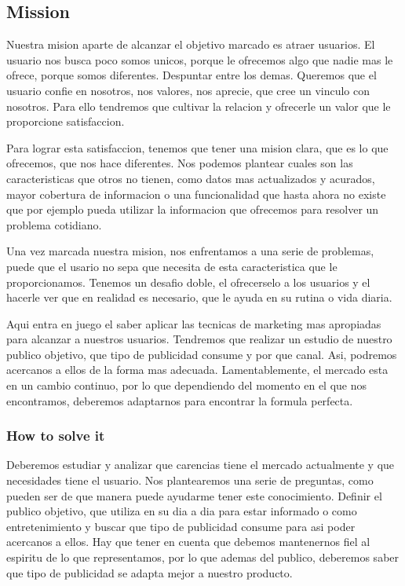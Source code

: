 \subsection{Mission}
Nuestra mision aparte de alcanzar el objetivo marcado es atraer usuarios.
El usuario nos busca poco somos unicos, porque le ofrecemos algo que
nadie mas le ofrece, porque somos diferentes. Despuntar entre los demas.
Queremos que el usuario confie en nosotros, nos valores, nos aprecie, que cree un vinculo con nosotros. Para
ello tendremos que cultivar la relacion y ofrecerle un valor que le proporcione satisfaccion.
 
Para lograr esta satisfaccion, tenemos que tener una mision clara, que es lo que ofrecemos, que nos hace diferentes.
Nos podemos plantear cuales son las caracteristicas que otros no tienen, como datos mas actualizados y acurados, 
mayor cobertura de informacion o una funcionalidad que hasta ahora no existe que por ejemplo pueda utilizar la 
informacion que ofrecemos para resolver un problema cotidiano.

Una vez marcada nuestra mision, nos enfrentamos a una serie de problemas, puede que el usario no sepa que 
necesita de esta caracteristica que le proporcionamos. Tenemos un desafio doble, el ofrecerselo a los usuarios y 
el hacerle ver que en realidad es necesario, que le ayuda en su rutina o vida diaria.

Aqui entra en juego el saber aplicar las tecnicas de marketing mas apropiadas para alcanzar a nuestros usuarios.
Tendremos que realizar un estudio de nuestro publico objetivo, que tipo de publicidad consume y por que canal. Asi,
podremos acercanos a ellos de la forma mas adecuada. Lamentablemente, el mercado esta en un cambio continuo,
por lo que dependiendo del momento en el que nos encontramos, deberemos adaptarnos para encontrar la formula 
perfecta.

\subsubsection{How to solve it} 
Deberemos estudiar y analizar que carencias tiene el mercado actualmente y que necesidades tiene el usuario.
Nos plantearemos una serie de preguntas, como pueden ser de que manera puede ayudarme tener este conocimiento.
Definir el publico objetivo, que utiliza en su dia a dia para estar informado o como entretenimiento y buscar
que tipo de publicidad consume para asi poder acercanos a ellos. Hay que tener en cuenta que debemos mantenernos
fiel al espiritu de lo que representamos, por lo que ademas del publico, deberemos saber que tipo de publicidad
se adapta mejor a nuestro producto.

